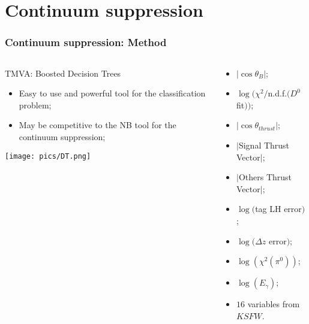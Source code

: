 \documentclass[10 pt,compress,mathserif]{beamer}
\begin{document}
\section{Continuum suppression}
\frame{\tableofcontents[current]}
\begin{frame}[containsverbatim]
\frametitle{Continuum suppression: Method}
\begin{columns}
 \begin{column}{0.5\textwidth}
  \begin{block}{TMVA: Boosted Decision Trees}
  \begin{itemize}
   \item Easy to use and powerful tool for the classification problem;
   \item May be competitive to the NB tool for the continuum suppression;
  \end{itemize}
  \begin{center}
   \texttt{[image: pics/DT.png]}\\
  \end{center}
  \end{block}
 \end{column}
 \begin{column}{0.5\textwidth}
  \begin{itemize}
   \item $\left|\cos\theta_{B}\right|$;
   \item $\log(\chi^2/$n.d.f.$(D^0$ fit$))$;
   \item $\left|\cos\theta_{thrust}\right|$;
   \item $|$Signal Thrust Vector$|$;
   \item $|$Others Thrust Vector$|$;
   \item $\log($tag LH error$)$;
   \item $\log(\Delta z$ error$)$;
   \item $\log(\chi^2(\pi^0))$;
   \item $\log(E_{\gamma})$;
   \item $16$ variables from $KSFW$.
  \end{itemize}
 \end{column}
\end{columns}
\end{frame}
\end{document}
